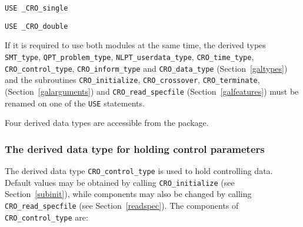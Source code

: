 \documentclass{galahad}
\newcommand{\packagename}{CRO}
\newcommand{\fullpackagename}{\libraryname\_\packagename}
\begin{document}
\hspace{8mm} {\tt USE \fullpackagename\_single}

\medskip{}

\hspace{8mm} {\tt USE  \fullpackagename\_double}

\medskip

\noindent
If it is required to use both modules at the same time, the derived types
{\tt SMT\_type},
{\tt QPT\_problem\_type},
{\tt NLPT\_user\-data\-\_type},
{\tt \packagename\_time\_type},
{\tt \packagename\_control\_type},
{\tt \packagename\_inform\_type}
and
{\tt \packagename\_data\_type}
(Section~\ref{galtypes})
and the subroutines
{\tt \packagename\_initialize},
{\tt \packagename\_\-crossover},
{\tt \packagename\_terminate},
(Section~\ref{galarguments})
and
{\tt \packagename\_read\_specfile}
(Section~\ref{galfeatures})
must be renamed on one of the {\tt USE} statements.





\galtypes
Four derived data types are accessible from the package.


\subsubsection{The derived data type for holding control
 parameters}\label{typecontrol}
The derived data type
{\tt \packagename\_control\_type}
is used to hold controlling data. Default values may be obtained by calling
{\tt \packagename\_initialize}
(see Section~\ref{subinit}),
while components may also be changed by calling
{\tt \packagename\_read\-\_specfile}
(see Section~\ref{readspec}).
The components of
{\tt \packagename\_control\_type}
are:
\end{document}
